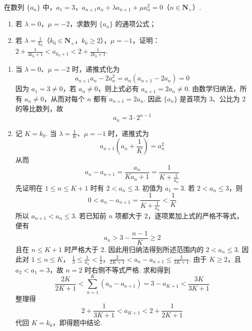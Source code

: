 \begin{problem}
在数列 \(\{a_{n}\}\) 中，\(a_{1} = 3\)，\(a_{n + 1}a_{n} + \lambda a_{n + 1} + \mu a_{n}^{2} = 0 \)（\(n \in \mathbf{N}_{+}\)）.

\begin{enumerate}
\item 若 \(\lambda = 0\)，\(\mu = -2\)，求数列 \(\{a_n\}\) 的通项公式；
\item 若 \(\lambda = \frac{1}{k_0}\)（\(k_0 \in \mathbf{N}_+\)，\(k_0 \geqslant 2\)），\(\mu = -1\)，证明： \(2 + \frac{1}{3k_0 + 1} < a_{k_0 + 1} < 2 + \frac{1}{2k_0 + 1}\).
\end{enumerate}
\end{problem}

\begin{solution}
\begin{enumerate}
\item 当 \(\lambda=0\)、\(\mu=-2\) 时，递推式化为
\[
a_{n+1}a_n-2a_n^2=a_n(a_{n+1}-2a_n)=0
\]
因为 \(a_1=3\ne0\)，若 \(a_n\ne0\)，则上式必有 \(a_{n+1}=2a_n\ne0\). 由数学归纳法，所有 \(a_n\ne0\)，从而对每个 \(n\) 都有 \(a_{n+1}=2a_n\). 因此 \(\{a_n\}\) 是首项为 \(3\)、公比为 \(2\) 的等比数列，故
\[
a_n=3\cdot2^{n-1}
\]
\item 记 \(K=k_0\). 当 \(\lambda=\frac1K\)、\(\mu=-1\) 时，递推式为
\[
a_{n+1}\left(a_n+\frac1K\right)=a_n^2
\]
从而
\[
a_n-a_{n+1}=\frac{a_n}{Ka_n+1}=\frac{1}{K+\frac1{a_n}}
\]
先证明在 \(1\leqslant n\leqslant K+1\) 时有 \(2<a_n\leqslant3\). 初值为 \(a_1=3\). 若 \(2<a_n\leqslant3\)，则
\[
0<a_n-a_{n+1}=\frac{1}{K+\frac{1}{a_n}}<\frac1K
\]
所以 \(a_{n+1}<a_n\leqslant3\). 若已知前 \(n\) 项都大于 \(2\)，逐项累加上式的严格不等式，便有
\[
a_n>3-\frac{n-1}{K}\geqslant2
\]
且在 \(n\leqslant K+1\) 时严格大于 \(2\). 因此用归纳法得到所述范围内的 \(2<a_n\leqslant3\).
因此对 \(1\leqslant n\leqslant K\)，
\(\frac13\leqslant\frac1{a_n}<\frac12\)，\(\frac{2}{2K+1}<a_n-a_{n+1}\leqslant\frac{3}{3K+1}\).
由于 \(K\geqslant2\)，且 \(a_2<a_1=3\)，故 \(n=2\) 时右侧不等式严格. 求和得到
\[
\frac{2K}{2K+1}<\sum_{n=1}^{K}(a_n-a_{n+1})=3-a_{K+1}<\frac{3K}{3K+1}
\]
整理得
\[
2+\frac{1}{3K+1}<a_{K+1}<2+\frac{1}{2K+1}
\]
代回 \(K=k_0\)，即得题中结论.
\end{enumerate}
\end{solution}

